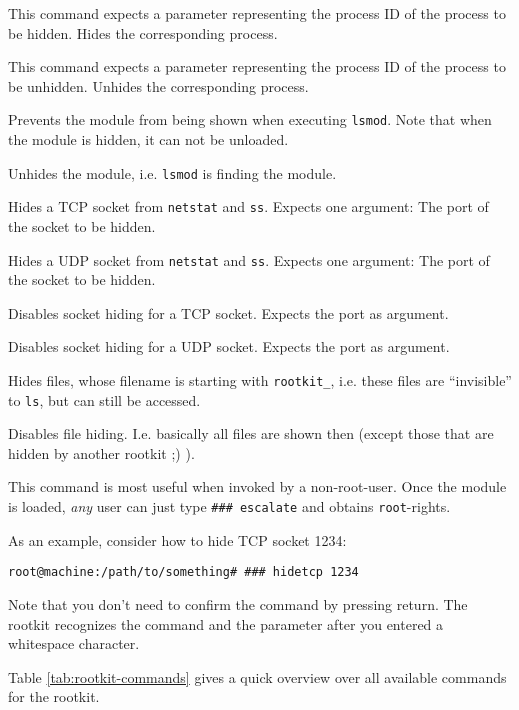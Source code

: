 \documentclass[10pt, letterpaper]{article}
\begin{document}
\begin{description}[font=\ttfamily]
\item[hideproc] This command expects a parameter representing the process ID of the process to be hidden. Hides the corresponding process. 
\item[unhideproc] This command expects a parameter representing the process ID of the process to be unhidden. Unhides the corresponding process. 
\item[hidemodule] Prevents the module from being shown when executing \texttt{lsmod}. Note that when the module is hidden, it can not be unloaded.
\item[unhidemodule] Unhides the module, i.e. \texttt{lsmod} is finding the module.
\item[hidetcp] Hides a TCP socket from \texttt{netstat} and \texttt{ss}. Expects one argument: The port of the socket to be hidden.
\item[hideudp] Hides a UDP socket from \texttt{netstat} and \texttt{ss}. Expects one argument: The port of the socket to be hidden. 
\item[unhidetcp] Disables socket hiding for a TCP socket. Expects the port as argument.
\item[unhideudp] Disables socket hiding for a UDP socket. Expects the port as argument. 
\item[hidefiles] Hides files, whose filename is starting with \texttt{rootkit\_}, i.e. these files are ``invisible'' to \texttt{ls}, but can still be accessed. 
\item[unhidefiles] Disables file hiding. I.e. basically all files are shown then (except those that are hidden by another rootkit ;) ).
\item[escalate] This command is most useful when invoked by a non-root-user. Once the module is loaded, \emph{any} user can just type \texttt{\#\#\# escalate} and obtains \texttt{root}-rights.
\end{description}

As an example, consider how to hide TCP socket 1234:

\begin{verbatim}
root@machine:/path/to/something# ### hidetcp 1234
\end{verbatim}

Note that you don't need to confirm the command by pressing return. The rootkit recognizes the command and the parameter after you entered a whitespace character.

Table \ref{tab:rootkit-commands} gives a quick overview over all available commands for the rootkit.
\end{document}
